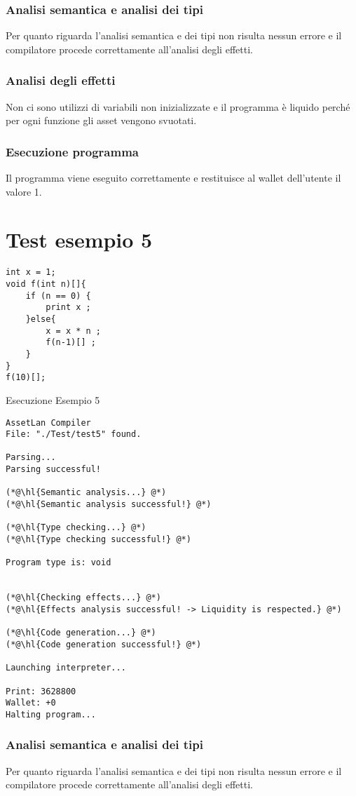 \documentclass[12pt,twoside,openright,a4paper]{report}
\begin{document}
\subsubsection{Analisi semantica e analisi dei tipi}
Per quanto riguarda l'analisi semantica e dei tipi non risulta nessun errore e il compilatore procede correttamente all'analisi degli effetti.

\subsubsection{Analisi degli effetti}
Non ci sono utilizzi di variabili non inizializzate e il programma è liquido perché per ogni funzione gli asset vengono svuotati.

\subsubsection{Esecuzione programma}
Il programma viene eseguito correttamente e restituisce al wallet dell'utente il valore 1.

\section{Test esempio 5}
\begin{lstlisting}
int x = 1;
void f(int n)[]{
	if (n == 0) {
	    print x ;
	}else{
	    x = x * n ;
	    f(n-1)[] ;
	}
}
f(10)[];
\end{lstlisting}
Esecuzione Esempio 5
\begin{lstlisting}
AssetLan Compiler
File: "./Test/test5" found.

Parsing...
Parsing successful!

(*@\hl{Semantic analysis...} @*)
(*@\hl{Semantic analysis successful!} @*)

(*@\hl{Type checking...} @*)
(*@\hl{Type checking successful!} @*)

Program type is: void


(*@\hl{Checking effects...} @*)
(*@\hl{Effects analysis successful! -> Liquidity is respected.} @*)

(*@\hl{Code generation...} @*)
(*@\hl{Code generation successful!} @*)

Launching interpreter...

Print: 3628800
Wallet: +0
Halting program...
\end{lstlisting}

\subsubsection{Analisi semantica e analisi dei tipi}
Per quanto riguarda l'analisi semantica e dei tipi non risulta nessun errore e il compilatore procede correttamente all'analisi degli effetti.
\end{document}
